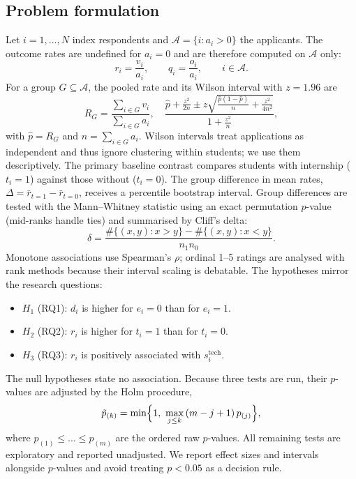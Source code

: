 \documentclass[conference]{IEEEtran}
\begin{document}
\subsection{Problem formulation}
\label{sec:formal}
Let $i=1,\dots,N$ index respondents and $\mathcal{A}=\{i:a_i>0\}$ the applicants. The outcome rates are undefined for $a_i=0$ and are therefore computed on $\mathcal{A}$ only:
\begin{equation}
r_i=\frac{v_i}{a_i},\qquad q_i=\frac{o_i}{a_i},\qquad i\in\mathcal{A}.
\label{eq:rate}
\end{equation}
For a group $G\subseteq\mathcal{A}$, the pooled rate and its Wilson interval with $z=1.96$ are
\begin{equation}
R_G=\frac{\sum_{i\in G}v_i}{\sum_{i\in G}a_i},\quad
\frac{\hat p+\frac{z^2}{2n}\pm z\sqrt{\frac{\hat p(1-\hat p)}{n}+\frac{z^2}{4n^2}}}{1+\frac{z^2}{n}},
\label{eq:wilson}
\end{equation}
with $\hat p=R_G$ and $n=\sum_{i\in G}a_i$. Wilson intervals treat applications as independent and thus ignore clustering within students; we use them descriptively. The primary baseline contrast compares students with internship ($t_i=1$) against those without ($t_i=0$). The group difference in mean rates, $\Delta=\bar r_{t=1}-\bar r_{t=0}$, receives a percentile bootstrap interval. Group differences are tested with the Mann--Whitney statistic using an exact permutation $p$-value (mid-ranks handle ties) and summarised by Cliff's delta:
\begin{equation}
\delta=\frac{\#\{(x,y):x>y\}-\#\{(x,y):x<y\}}{n_1 n_0}.
\label{eq:cliff}
\end{equation}
Monotone associations use Spearman's $\rho$; ordinal 1--5 ratings are analysed with rank methods because their interval scaling is debatable. The hypotheses mirror the research questions:
\begin{itemize}
 \item $H_1$ (RQ1): $d_i$ is higher for $e_i=0$ than for $e_i=1$.
 \item $H_2$ (RQ2): $r_i$ is higher for $t_i=1$ than for $t_i=0$.
 \item $H_3$ (RQ3): $r_i$ is positively associated with $s^{\mathrm{tech}}_i$.
\end{itemize}
The null hypotheses state no association. Because three tests are run, their $p$-values are adjusted by the Holm procedure,
\begin{equation}
\tilde p_{(k)}=\min\Bigl\{1,\ \max_{j\le k}\,(m-j+1)\,p_{(j)}\Bigr\},
\label{eq:holm}
\end{equation}
where $p_{(1)}\le\dots\le p_{(m)}$ are the ordered raw $p$-values. All remaining tests are exploratory and reported unadjusted. We report effect sizes and intervals alongside $p$-values and avoid treating $p<0.05$ as a decision rule.
\end{document}
